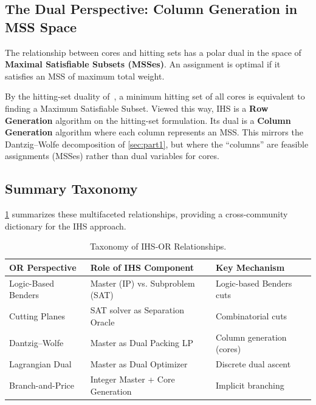 \subsection{The Dual Perspective: Column Generation in MSS Space}
\label{sec:mssspace}

The relationship between cores and hitting sets has a polar dual in the space of
\textbf{Maximal Satisfiable Subsets (MSSes)}. An assignment is optimal if it
satisfies an MSS of maximum total weight.

By the hitting-set duality of~\citet{liffiton2008algorithms}, a minimum hitting
set of all cores is equivalent to finding a Maximum Satisfiable Subset. Viewed
this way, IHS is a \textbf{Row Generation} algorithm on the hitting-set formulation.
Its dual is a \textbf{Column Generation} algorithm where each column represents an
MSS. This mirrors the Dantzig--Wolfe decomposition of \cref{sec:part1}, but where the
``columns'' are feasible assignments (MSSes) rather than dual variables for
cores.

\subsection{Summary Taxonomy}
\label{sec:taxonomy-summary}

\cref{tab:taxonomy} summarizes these multifaceted relationships, providing a
cross-community dictionary for the IHS approach.

\begin{table}[htbp]
\centering
\small
\caption{Taxonomy of IHS-OR Relationships.}
\label{tab:taxonomy}
\begin{tabular}{lll}
\toprule
\textbf{OR Perspective} & \textbf{Role of IHS Component} & \textbf{Key Mechanism} \\
\midrule
Logic-Based Benders & Master (IP) vs. Subproblem (SAT) & Logic-based Benders cuts \\
Cutting Planes      & SAT solver as Separation Oracle  & Combinatorial cuts \\
Dantzig--Wolfe      & Master as Dual Packing LP        & Column generation (cores) \\
Lagrangian Dual     & Master as Dual Optimizer         & Discrete dual ascent \\
Branch-and-Price    & Integer Master + Core Generation & Implicit branching \\
\bottomrule
\end{tabular}
\end{table}

